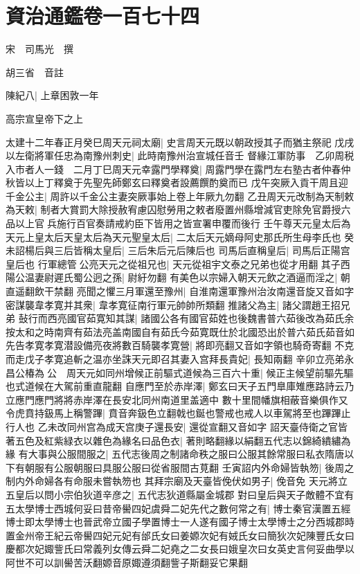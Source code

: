 \section{資治通鑑卷一百七十四}
宋　司馬光　撰

胡三省　音註

陳紀八|{
	上章困敦一年}


高宗宣皇帝下之上

太建十二年春正月癸巳周天元祠太廟|{
	史言周天元既以朝政授其子而猶主祭祀}
戊戌以左衛將軍任忠為南豫州刺史|{
	此時南豫州治宣城任音壬}
督緣江軍防事　乙卯周税入市者人一錢　二月丁巳周天元幸露門學釋奠|{
	周露門學在露門左右塾古者仲春仲秋皆以上丁釋奠于先聖先師鄭玄曰釋奠者設薦饌酌奠而已}
戊午突厥入貢干周且迎千金公主|{
	周許以千金公主妻突厥事始上卷上年厥九勿翻}
乙丑周天元改制為天制敕為天敕|{
	制者大賞罰大除授赦宥慮囚慰勞用之敕者廢置州縣增減官吏除免官爵授六品以上官兵施行百官奏請戒約臣下皆用之皆宣署申覆而後行}
壬午尊天元皇太后為天元上皇太后天皇太后為天元聖皇太后|{
	二太后天元嫡母阿史那氏所生母李氏也}
癸未詔楊后與三后皆稱太皇后|{
	三后朱后元后陳后也}
司馬后直稱皇后|{
	司馬后正陽宫皇后也}
行軍總管公亮天元之從祖兄也|{
	天元從祖宇文泰之兄弟也從才用翻}
其子西陽公温妻尉遲氏蜀公迥之孫|{
	尉紆勿翻}
有美色以宗婦入朝天元飲之酒逼而淫之|{
	朝直遥翻飲干禁翻}
亮聞之懼三月軍還至豫州|{
	自淮南還軍豫州治汝南還音旋又音如字}
密謀襲韋孝寛并其衆|{
	韋孝寛征南行軍元帥帥所類翻}
推諸父為主|{
	諸父謂趙王招兄弟}
鼔行而西亮國官茹寛知其謀|{
	諸國公各有國官茹姓也後魏書普六茹後改為茹氏余按太和之時南齊有茹法亮盖南國自有茹氏今茹寛既仕於北國恐出於普六茹氏茹音如}
先告孝寛孝寛潜設備亮夜將數百騎襲孝寛營|{
	將即亮翻又音如字領也騎奇寄翻}
不克而走戊子孝寛追斬之温亦坐誅天元即召其妻入宫拜長貴妃|{
	長知兩翻}
辛卯立亮弟永昌公椿為公　周天元如同州增候正前驅式道候為三百六十重|{
	候正主候望前驅先驅也式道候在大駕前重直龍翻}
自應門至於赤岸澤|{
	鄭玄曰天子五門臯庫雉應路詩云乃立應門應門將將赤岸澤在長安北同州南道里盖適中}
數十里間幡旗相蔽音樂俱作又令虎賁持鈒馬上稱警蹕|{
	賁音奔鈒色立翻戟也鋋也警戒也戒人以車駕將至也蹕蹕止行人也}
乙未改同州宫為成天宫庚子還長安|{
	還從宣翻又音如字}
詔天臺侍衛之官皆著五色及紅紫緑衣以雜色為緣名曰品色衣|{
	著則略翻緣以絹翻五代志以錦綺繢繡為緣}
有大事與公服間服之|{
	五代志後周之制諸命秩之服曰公服其餘常服曰私衣隋唐以下有朝服有公服朝服曰具服公服曰從省服間古莧翻}
壬寅詔内外命婦皆執笏|{
	後周之制内外命婦各有命服未嘗執笏也}
其拜宗廟及天臺皆俛伏如男子|{
	俛音免}
天元將立五皇后以問小宗伯狄道辛彦之|{
	五代志狄道縣屬金城郡}
對曰皇后與天子敵體不宜有五太學博士西城何妥曰昔帝嚳四妃虞舜二妃先代之數何常之有|{
	博士秦官漢置五經博士即太學博士也晉武帝立國子學置博士一人遂有國子博士太學博士之分西城郡時置金州帝王紀云帝嚳四妃元妃有邰氏女曰姜嫄次妃有娀氏女曰簡狄次妃陳豐氏女曰慶都次妃娵訾氏曰常義列女傳云舜二妃堯之二女長曰娥皇次曰女英史言何妥曲學以阿世不可以訓嚳苦沃翻嫄音原娵遵須翻訾子斯翻妥它果翻}
